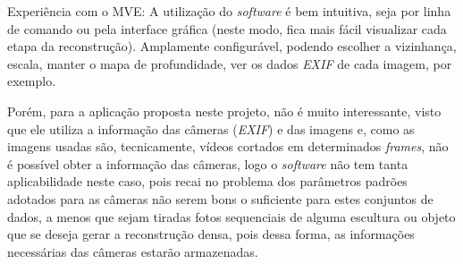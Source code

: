 
Experiência com o MVE: A utilização do {\it software} é bem intuitiva, seja por linha de comando ou pela interface gráfica (neste modo, fica mais fácil visualizar cada etapa da reconstrução). Amplamente configurável, podendo escolher a vizinhança, escala, manter o mapa de profundidade, ver os dados {\it EXIF} de cada imagem, por exemplo.

Porém, para a aplicação proposta neste projeto, não é muito interessante, visto que ele utiliza a informação das câmeras ({\it EXIF}) e das imagens e, como as imagens usadas são, tecnicamente, vídeos cortados em determinados {\it frames}, não é possível obter a informação das câmeras, logo o {\it software} não tem tanta aplicabilidade neste caso, pois recai no problema dos parâmetros padrões adotados para as câmeras não serem bons o suficiente para estes conjuntos de dados, a menos que sejam tiradas fotos sequenciais de alguma escultura ou objeto que se deseja gerar a reconstrução densa, pois dessa forma, as informações necessárias das câmeras estarão armazenadas. 